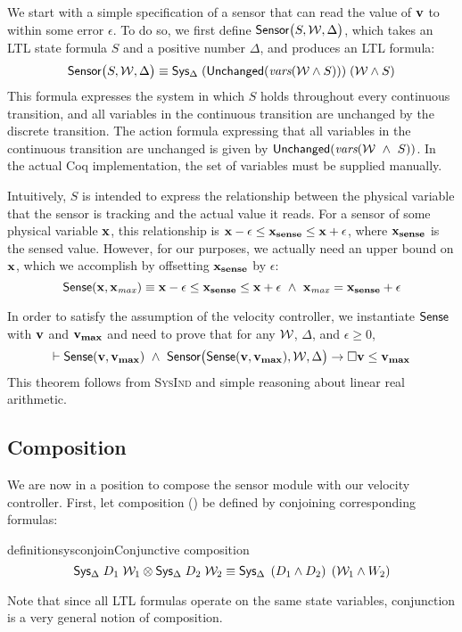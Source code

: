 We start with a simple specification of a sensor that can read the value of
$\mathbf{v}$ to within some error $\epsilon$.  To do so, we first define
${\textsf{Sensor}}\big(S,\mathcal{W}, \Delta\big)$, which takes an LTL state formula $S$ and a
positive number $\Delta$, and produces an LTL formula:
\[
{\textsf{Sensor}}\big(S,\mathcal{W}, \Delta\big) \equiv {\textsf{Sys}}{}_{\Delta}\;(\mathsf{Unchanged}(\textit{vars}(\mathcal{W} \wedge S)))\;(\mathcal{W} \wedge S)
\]
This formula expresses the system in which $S$ holds throughout every
continuous transition, and all variables in the continuous transition are
unchanged by the discrete transition. The action formula expressing that
all variables in the continuous transition are unchanged is given by
$\mathsf{Unchanged}(\textit{vars}(\mathcal{W}~\wedge~S))$. In the actual Coq implementation, the set
of variables must be supplied manually.

Intuitively, $S$ is intended to express the relationship between the
physical variable that the sensor is tracking and the actual value it
reads.  For a sensor of some physical variable $\mathbf{x}$, this relationship is
$\mathbf{x} - \epsilon \leq \mathbf{x_{sense}} \leq \mathbf{x} + \epsilon$, where $\mathbf{x_{sense}}$ is the
sensed value.  However, for our purposes, we actually need an upper bound
on $\mathbf{x}$, which we accomplish by offsetting $\mathbf{x_{sense}}$ by $\epsilon$:
\[
{\textsf{Sense}}(\mathbf{x},\mathbf{x_{\it max}}) \equiv
\mathbf{x} - \epsilon \leq \mathbf{x_{sense}} \leq \mathbf{x} + \epsilon~\wedge~\mathbf{x_{\it max}} = \mathbf{x_{sense}} + \epsilon
\]

In order to satisfy the assumption of the velocity controller, we
instantiate ${\textsf{Sense}}{}$ with $\mathbf{v}$ and $\mathbf{v_{max}}$ and need to prove that for
any $\mathcal{W}$, $\Delta$, and $\epsilon \geq 0$,
\begin{equation}
\vdash {\textsf{Sense}}(\mathbf{v},\mathbf{v_{max}})~\wedge~{\textsf{Sensor}}\big({\textsf{Sense}}(\mathbf{v},\mathbf{v_{max}}),\mathcal{W}, \Delta\big) \rightarrow \Box{} \mathbf{v} \leq \mathbf{v_{max}}
\label{thm:sense-safe}
\end{equation}
This theorem follows from \textsc{SysInd} and simple reasoning about linear
real arithmetic.

\subsection{Composition}
We are now in a position to compose the sensor module with our velocity
controller.  First, let \SysA{} composition (\SysConjoin{}) be defined by
conjoining corresponding formulas:
\begin{restatable}{definition}{sysconjoin}{Conjunctive composition}
\[
{\textsf{Sys}}{}_{\Delta}\;D_1\;\mathcal{W}_1 \otimes {\textsf{Sys}}{}_{\Delta}\;D_2\;\mathcal{W}_2 \equiv {\textsf{Sys}}{}_{\Delta}\;\left(D_1 \wedge D_2\right)\;\left(\mathcal{W}_1 \wedge W_2\right)
\]
\end{restatable}
Note that since all LTL formulas operate on the same state variables,
conjunction is a very general notion of composition.

